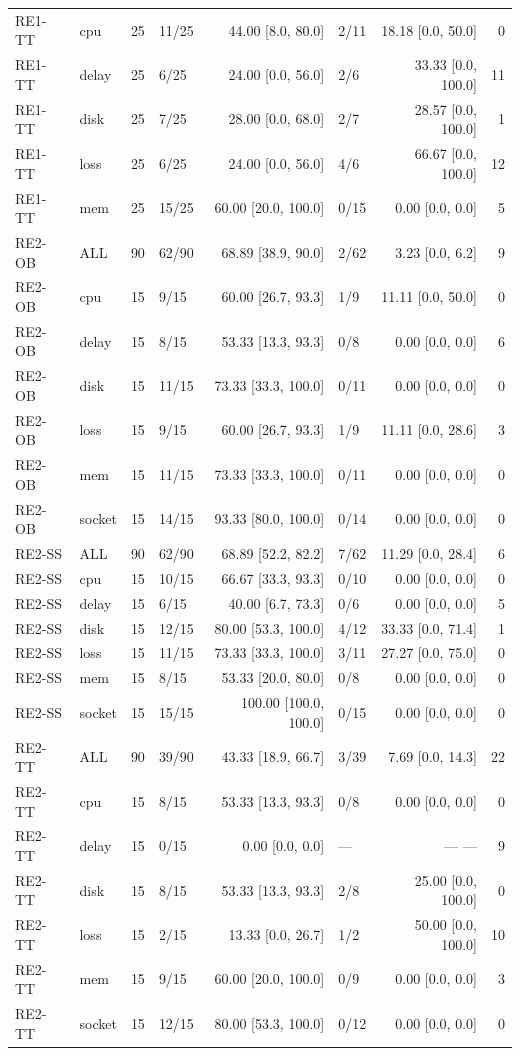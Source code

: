 \begin{tabular*}{\linewidth}{@{\extracolsep{\fill}}llrlrlrr@{}}
RE1-TT & cpu & 25 & 11/25 & 44.00 [8.0, 80.0] & 2/11 & 18.18 [0.0, 50.0] & 0 \\
RE1-TT & delay & 25 & 6/25 & 24.00 [0.0, 56.0] & 2/6 & 33.33 [0.0, 100.0] & 11 \\
RE1-TT & disk & 25 & 7/25 & 28.00 [0.0, 68.0] & 2/7 & 28.57 [0.0, 100.0] & 1 \\
RE1-TT & loss & 25 & 6/25 & 24.00 [0.0, 56.0] & 4/6 & 66.67 [0.0, 100.0] & 12 \\
RE1-TT & mem & 25 & 15/25 & 60.00 [20.0, 100.0] & 0/15 & 0.00 [0.0, 0.0] & 5 \\
RE2-OB & ALL & 90 & 62/90 & 68.89 [38.9, 90.0] & 2/62 & 3.23 [0.0, 6.2] & 9 \\
RE2-OB & cpu & 15 & 9/15 & 60.00 [26.7, 93.3] & 1/9 & 11.11 [0.0, 50.0] & 0 \\
RE2-OB & delay & 15 & 8/15 & 53.33 [13.3, 93.3] & 0/8 & 0.00 [0.0, 0.0] & 6 \\
RE2-OB & disk & 15 & 11/15 & 73.33 [33.3, 100.0] & 0/11 & 0.00 [0.0, 0.0] & 0 \\
RE2-OB & loss & 15 & 9/15 & 60.00 [26.7, 93.3] & 1/9 & 11.11 [0.0, 28.6] & 3 \\
RE2-OB & mem & 15 & 11/15 & 73.33 [33.3, 100.0] & 0/11 & 0.00 [0.0, 0.0] & 0 \\
RE2-OB & socket & 15 & 14/15 & 93.33 [80.0, 100.0] & 0/14 & 0.00 [0.0, 0.0] & 0 \\
RE2-SS & ALL & 90 & 62/90 & 68.89 [52.2, 82.2] & 7/62 & 11.29 [0.0, 28.4] & 6 \\
RE2-SS & cpu & 15 & 10/15 & 66.67 [33.3, 93.3] & 0/10 & 0.00 [0.0, 0.0] & 0 \\
RE2-SS & delay & 15 & 6/15 & 40.00 [6.7, 73.3] & 0/6 & 0.00 [0.0, 0.0] & 5 \\
RE2-SS & disk & 15 & 12/15 & 80.00 [53.3, 100.0] & 4/12 & 33.33 [0.0, 71.4] & 1 \\
RE2-SS & loss & 15 & 11/15 & 73.33 [33.3, 100.0] & 3/11 & 27.27 [0.0, 75.0] & 0 \\
RE2-SS & mem & 15 & 8/15 & 53.33 [20.0, 80.0] & 0/8 & 0.00 [0.0, 0.0] & 0 \\
RE2-SS & socket & 15 & 15/15 & 100.00 [100.0, 100.0] & 0/15 & 0.00 [0.0, 0.0] & 0 \\
RE2-TT & ALL & 90 & 39/90 & 43.33 [18.9, 66.7] & 3/39 & 7.69 [0.0, 14.3] & 22 \\
RE2-TT & cpu & 15 & 8/15 & 53.33 [13.3, 93.3] & 0/8 & 0.00 [0.0, 0.0] & 0 \\
RE2-TT & delay & 15 & 0/15 & 0.00 [0.0, 0.0] & --- & --- --- & 9 \\
RE2-TT & disk & 15 & 8/15 & 53.33 [13.3, 93.3] & 2/8 & 25.00 [0.0, 100.0] & 0 \\
RE2-TT & loss & 15 & 2/15 & 13.33 [0.0, 26.7] & 1/2 & 50.00 [0.0, 100.0] & 10 \\
RE2-TT & mem & 15 & 9/15 & 60.00 [20.0, 100.0] & 0/9 & 0.00 [0.0, 0.0] & 3 \\
RE2-TT & socket & 15 & 12/15 & 80.00 [53.3, 100.0] & 0/12 & 0.00 [0.0, 0.0] & 0 \\
\bottomrule
\end{tabular*}
